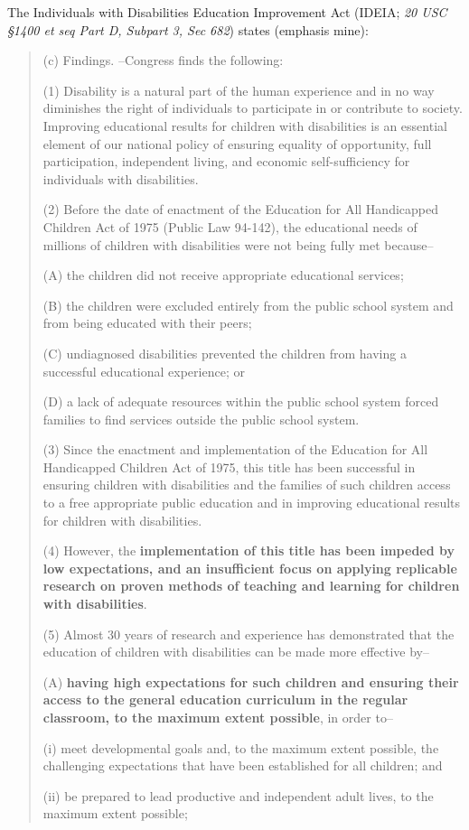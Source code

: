 \documentclass[twoside]{article}
\begin{document}
The Individuals with Disabilities Education Improvement Act (IDEIA; \textit{20 USC §1400 et seq Part D, Subpart 3, Sec 682}) states (emphasis mine):
\begin{quote}
(c) Findings. --Congress finds the following:

\qquad (1) Disability is a natural part of the human experience and in no way diminishes the right of individuals to participate in or contribute to society. Improving educational results for children with disabilities is an essential element of our national policy of ensuring equality of opportunity, full participation, independent living, and economic self-sufficiency for individuals with disabilities.

\qquad (2) Before the date of enactment of the Education for All Handicapped Children Act of 1975 (Public Law 94-142), the educational needs of millions of children with disabilities were not being fully met because--

\qquad \qquad (A) the children did not receive appropriate educational services;

\qquad \qquad (B) the children were excluded entirely from the public school system and from being educated with their peers;

\qquad \qquad (C) undiagnosed disabilities prevented the children from having a successful educational experience; or

\qquad \qquad (D) a lack of adequate resources within the public school system forced families to find services outside the public school system.

\qquad (3) Since the enactment and implementation of the Education for All Handicapped Children Act of 1975, this title has been successful in ensuring children with disabilities and the families of such children access to a free appropriate public education and in improving educational results for children with disabilities.

\qquad (4) However, the \textbf{implementation of this title has been impeded by low expectations, and an insufficient focus on applying replicable research on proven methods of teaching and learning for children with disabilities}.

\qquad (5) Almost 30 years of research and experience has demonstrated that the education of children with disabilities can be made more effective by--

\qquad \qquad (A) \textbf{having high expectations for such children and ensuring their access to the general education curriculum in the regular classroom, to the maximum extent possible}, in order to--

\qquad \qquad \qquad (i) meet developmental goals and, to the maximum extent possible, the challenging expectations that have been established for all children; and

\qquad \qquad \qquad (ii) be prepared to lead productive and independent adult lives, to the maximum extent possible;
\end{quote}
\end{document}
